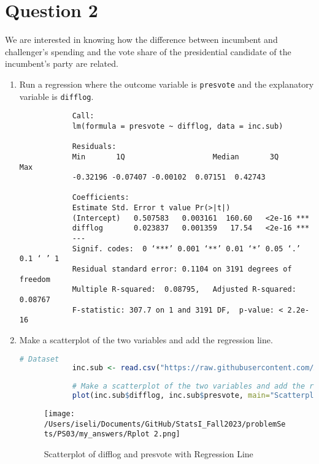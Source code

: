 \documentclass[12pt,letterpaper]{article}
\begin{document}
\section*{Question 2}
\noindent We are interested in knowing how the difference between incumbent and challenger's spending and the vote share of the presidential candidate of the incumbent's party are related.	\vspace{.25cm}
	\begin{enumerate}
		\item Run a regression where the outcome variable is \texttt{presvote} and the explanatory variable is \texttt{difflog}.	\vspace{0.05cm}
		
					\begin{verbatim}
			Call:
			lm(formula = presvote ~ difflog, data = inc.sub)
			
			Residuals:
			Min       1Q   					Median       3Q      Max  
			-0.32196 -0.07407 -0.00102  0.07151  0.42743 
			
			Coefficients:
			Estimate Std. Error t value Pr(>|t|)    
			(Intercept)   0.507583   0.003161  160.60   <2e-16 ***
			difflog       0.023837   0.001359   17.54   <2e-16 ***
			---
			Signif. codes:  0 ‘***’ 0.001 ‘**’ 0.01 ‘*’ 0.05 ‘.’ 0.1 ‘ ’ 1
			Residual standard error: 0.1104 on 3191 degrees of freedom
			Multiple R-squared:  0.08795,	Adjusted R-squared:  0.08767
			F-statistic: 307.7 on 1 and 3191 DF,  p-value: < 2.2e-16
				\end{verbatim}
	\newpage			
		\item Make a scatterplot of the two variables and add the regression line. 	\vspace{0.05cm}
			\begin{lstlisting}[language=R]
			# Dataset
			inc.sub <- read.csv("https://raw.githubusercontent.com/ASDS-TCD/StatsI_Fall2023/main/datasets/incumbents_subset.csv")
			
			# Make a scatterplot of the two variables and add the regression line
			plot(inc.sub$difflog, inc.sub$presvote, main="Scatterplot of difflog and presvote with Regression Line")abline(lm_model, col="red")
		\end{lstlisting}			
		\vspace{0.05cm}
		\begin{figure}[h!]
			\centering
			\texttt{[image: /Users/iseli/Documents/GitHub/StatsI\_Fall2023/problemSets/PS03/my\_answers/Rplot 2.png]}
			\caption{Scatterplot of difflog and presvote with Regression Line}
			\label{fig:scatterplot difflog and presvote}
		\end{figure}
		

\end{enumerate}
\end{document}
